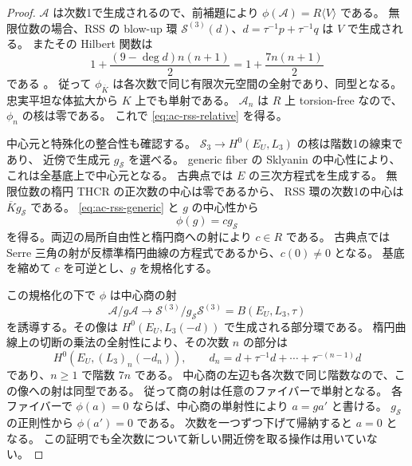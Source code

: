 \begin{proof}
$\mathscr A$ は次数1で生成されるので、前補題により
$\phi(\mathscr A)=R\langle V\rangle$ である。
無限位数の場合、RSS の blow-up 環
$\mathcal S^{(3)}(d)$、$d=\tau^{-1}p+\tau^{-1}q$ は $V$ で生成される。
またその Hilbert 関数は
\[
             1+\frac{(9-\deg d)n(n+1)}2
             =1+\frac{7n(n+1)}2
\]
である \cite[定義5.1、定理5.3]{BlowupRSS2015}。
従って $\phi_{\overline K}$ は各次数で同じ有限次元空間の全射であり、同型となる。
忠実平坦な体拡大から $K$ 上でも単射である。
$\mathscr A_n$ は $R$ 上 torsion-free なので、$\phi_n$ の核は零である。
これで \eqref{eq:ac-rss-relative} を得る。

中心元と特殊化の整合性も確認する。
$\mathcal S_3\to H^0(E_U,L_3)$ の核は階数1の線束であり、
近傍で生成元 $g_{\mathcal S}$ を選べる。
generic fiber の Sklyanin の中心性により、これは全基底上で中心元となる。
古典点では $E$ の三次方程式を生成する。
無限位数の楕円 THCR の正次数の中心は零であるから、
RSS 環の次数1の中心は $\overline K g_{\mathcal S}$ である。
\eqref{eq:ac-rss-generic} と $g$ の中心性から
\[
                          \phi(g)=c g_{\mathcal S}
\]
を得る。両辺の局所自由性と楕円商への射により $c\in R$ である。
古典点では Serre 三角の射が反標準楕円曲線の方程式であるから、$c(0)\ne0$ となる。
基底を縮めて $c$ を可逆とし、$g$ を規格化する。

この規格化の下で $\phi$ は中心商の射
\[
 \mathscr A/g\mathscr A\longrightarrow
 \mathcal S^{(3)}/g_{\mathcal S}\mathcal S^{(3)}=B(E_U,L_3,\tau)
\]
を誘導する。その像は $H^0(E_U,L_3(-d))$ で生成される部分環である。
楕円曲線上の切断の乗法の全射性により、その次数 $n$ の部分は
\[
 H^0\!\left(E_U,(L_3)_n(-d_n)\right),\qquad
 d_n=d+\tau^{-1}d+\cdots+\tau^{-(n-1)}d
\]
であり、$n\ge1$ で階数 $7n$ である。
中心商の左辺も各次数で同じ階数なので、この像への射は同型である。
従って商の射は任意のファイバーで単射となる。
各ファイバーで $\phi(a)=0$ ならば、中心商の単射性により $a=g a'$ と書ける。
$g_{\mathcal S}$ の正則性から $\phi(a')=0$ である。
次数を一つずつ下げて帰納すると $a=0$ となる。
この証明でも全次数について新しい開近傍を取る操作は用いていない。
\end{proof}

